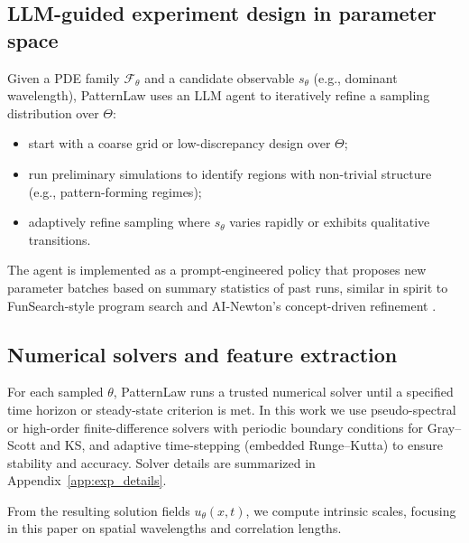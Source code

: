 \documentclass{article}
\theoremstyle{plain}
\theoremstyle{definition}
\theoremstyle{remark}
\begin{document}
\subsection{LLM-guided experiment design in parameter space}

Given a PDE family $\mathcal{F}_\theta$ and a candidate observable $s_\theta$ (e.g., dominant wavelength), PatternLaw uses an LLM agent to iteratively refine a sampling distribution over $\Theta$:
\begin{itemize}
    \item start with a coarse grid or low-discrepancy design over $\Theta$;
    \item run preliminary simulations to identify regions with non-trivial structure (e.g., pattern-forming regimes);
    \item adaptively refine sampling where $s_\theta$ varies rapidly or exhibits qualitative transitions.
\end{itemize}
The agent is implemented as a prompt-engineered policy that proposes new parameter batches based on summary statistics of past runs, similar in spirit to FunSearch-style program search \citep{RomeraParedes2024FunSearch} and AI-Newton's concept-driven refinement \citep{Fang2025AINewton}.

\subsection{Numerical solvers and feature extraction}
\label{sec:fft_method}

For each sampled $\theta$, PatternLaw runs a trusted numerical solver until a specified time horizon or steady-state criterion is met. In this work we use pseudo-spectral or high-order finite-difference solvers with periodic boundary conditions for Gray--Scott and KS, and adaptive time-stepping (embedded Runge--Kutta) to ensure stability and accuracy. Solver details are summarized in Appendix~\ref{app:exp_details}.

From the resulting solution fields $u_\theta(x,t)$, we compute intrinsic scales, focusing in this paper on spatial wavelengths and correlation lengths.
\end{document}
